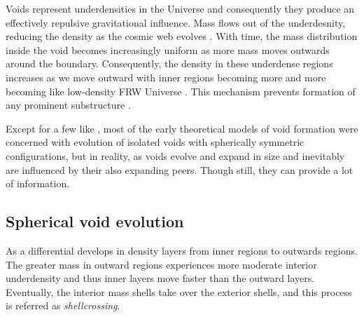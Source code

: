 \documentclass[fleqn,usenatbib]{mnras}
\begin{document}
Voids represent underdensities in the Universe and consequently they produce an effectively repulsive gravitational influence. Mass flows out of the underdesnity, reducing the density as the cosmic web evolves \citep{cautun_evolution_2014}. With time, the mass distribution inside the void becomes increasingly uniform as more mass moves outwards around the boundary. Consequently, the density in these underdense regions increases as we move outward with inner regions becoming more and more becoming like low-density FRW Universe \citep{goldberg_simulating_2004}. This mechanism prevents formation of any prominent substructure \citep{cautun_evolution_2014}.

Except for a few like \citet{icke_voids_1984}, most of the early theoretical models of void formation were concerned with evolution of isolated voids \citep{hoffman_origin_1982, bertschinger_self-similar_1985, blumenthal_largest_1992} with spherically symmetric configurations, but in reality, as voids evolve and expand in size and inevitably are influenced by their also expanding peers. Though still, they can provide a lot of information. 

\subsection{Spherical void evolution}
As a differential develops in density layers from inner regions to outwards regions. The greater mass in outward regions experiences more moderate interior underdensity and thus inner layers move faster than the outward layers. Eventually, the interior mass shells take over the exterior shells, and this process is referred as \textit{shellcrossing}.
\end{document}
